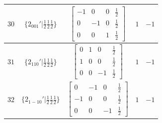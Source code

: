 \documentclass[fleqn,8pt]{jsarticle}
\begin{document}
\begin{longtable}{ccccc}
$ 30 $ & $ \{2{}_{001}{}'|\frac{1}{2} \frac{1}{2} \frac{1}{2}\} $ & $ \begin{bmatrix} -1 & 0 & 0 & \frac{1}{2} \\ 0 & -1 & 0 & \frac{1}{2} \\ 0 & 0 & 1 & \frac{1}{2} \end{bmatrix} $ & $ 1 $ & $ -1 $ \\ \hline
$ 31 $ & $ \{2{}_{110}{}'|\frac{1}{2} \frac{1}{2} \frac{1}{2}\} $ & $ \begin{bmatrix} 0 & 1 & 0 & \frac{1}{2} \\ 1 & 0 & 0 & \frac{1}{2} \\ 0 & 0 & -1 & \frac{1}{2} \end{bmatrix} $ & $ 1 $ & $ -1 $ \\ \hline
$ 32 $ & $ \{2{}_{1-10}{}'|\frac{1}{2} \frac{1}{2} \frac{1}{2}\} $ & $ \begin{bmatrix} 0 & -1 & 0 & \frac{1}{2} \\ -1 & 0 & 0 & \frac{1}{2} \\ 0 & 0 & -1 & \frac{1}{2} \end{bmatrix} $ & $ 1 $ & $ -1 $ \\
\end{longtable}
\end{document}
